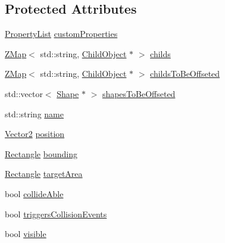 \subsection*{Protected Attributes}
\begin{DoxyCompactItemize}
\item 
\hyperlink{classZeta_1_1PropertyList}{Property\+List} \hyperlink{classZeta_1_1Object_a016caea2cc9a05ded2ce7a4c552bc6f3}{custom\+Properties}
\item 
\hyperlink{namespaceZeta_a9af2e12c4e432d2a1725f19e5a648a04}{Z\+Map}$<$ std\+::string, \hyperlink{classZeta_1_1ChildObject}{Child\+Object} $\ast$ $>$ \hyperlink{classZeta_1_1Object_a096fb830516bf1ec03d3e393e59c9538}{childs}
\item 
\hyperlink{namespaceZeta_a9af2e12c4e432d2a1725f19e5a648a04}{Z\+Map}$<$ std\+::string, \hyperlink{classZeta_1_1ChildObject}{Child\+Object} $\ast$ $>$ \hyperlink{classZeta_1_1Object_a655c8364527b4257b0a8f565fc633d9d}{childs\+To\+Be\+Offseted}
\item 
std\+::vector$<$ \hyperlink{classZeta_1_1Shape}{Shape} $\ast$ $>$ \hyperlink{classZeta_1_1Object_a4680f2dd1ca348e68baa45386b20ee6b}{shapes\+To\+Be\+Offseted}
\item 
std\+::string \hyperlink{classZeta_1_1Object_ace4ef81b7c300e0a170292e9888cd66f}{name}
\item 
\hyperlink{classZeta_1_1Vector2}{Vector2} \hyperlink{classZeta_1_1Object_a4035f758ac73cb1f0e4d85778d033956}{position}
\item 
\hyperlink{classZeta_1_1Rectangle}{Rectangle} \hyperlink{classZeta_1_1Object_a7dc7d781f8f3d6f38860b4df26fc58c4}{bounding}
\item 
\hyperlink{classZeta_1_1Rectangle}{Rectangle} \hyperlink{classZeta_1_1Object_aca5eecedb46a3e27855c60ae371ecb95}{target\+Area}
\item 
bool \hyperlink{classZeta_1_1Object_ae01335456c115c493d4bb9c67c3897ce}{collide\+Able}
\item 
bool \hyperlink{classZeta_1_1Object_a3934d0e7fed3786937394643d2adc24c}{triggers\+Collision\+Events}
\item 
bool \hyperlink{classZeta_1_1Object_ade6a7a114b24232510cb6a23a2547f4d}{visible}
\end{DoxyCompactItemize}


